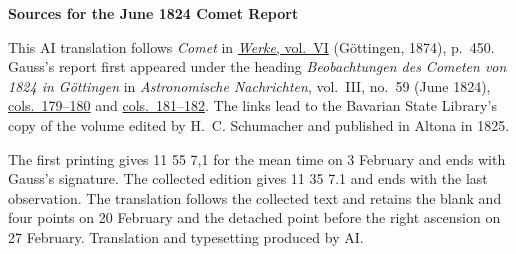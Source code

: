 \clearpage\thispagestyle{empty}
\begin{center}\textbf{Sources for the June 1824 Comet Report}\end{center}
\noindent This AI translation follows \textit{Comet} in \href{https://gdz.sub.uni-goettingen.de/id/PPN236007467}{\textit{Werke}, vol.~VI} (Göttingen, 1874), p.~450. Gauss’s report first appeared under the heading \textit{Beobachtungen des Cometen von 1824 in Göttingen} in \textit{Astronomische Nachrichten}, vol.~III, no.~59 (June 1824), \href{https://api.digitale-sammlungen.de/iiif/image/v2/bsb10049428_00102/full/1800,/0/default.jpg}{cols.~179--180} and \href{https://api.digitale-sammlungen.de/iiif/image/v2/bsb10049428_00103/full/1800,/0/default.jpg}{cols.~181--182}. The links lead to the Bavarian State Library’s copy of the volume edited by H.~C. Schumacher and published in Altona in 1825.
\par\smallskip\noindent The first printing gives 11 55 7,1 for the mean time on 3 February and ends with Gauss’s signature. The collected edition gives 11 35 7.1 and ends with the last observation. The translation follows the collected text and retains the blank and four points on 20 February and the detached point before the right ascension on 27 February. Translation and typesetting produced by AI.
\clearpage
